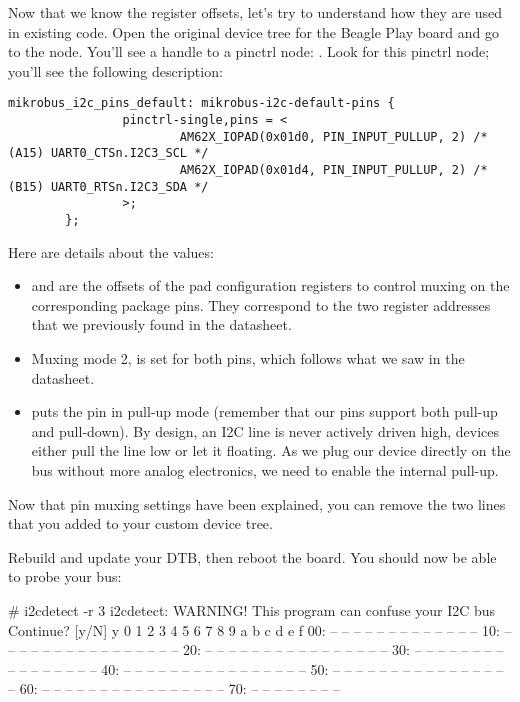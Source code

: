Now that we know the register offsets, let's try to understand
how they are used in existing code. Open the original device tree
for the Beagle Play board and go to the  node.
You'll see a handle to a pinctrl node: .
Look for this pinctrl node; you'll see the following description:

\begin{verbatim}
mikrobus_i2c_pins_default: mikrobus-i2c-default-pins {
                pinctrl-single,pins = < 
                        AM62X_IOPAD(0x01d0, PIN_INPUT_PULLUP, 2) /* (A15) UART0_CTSn.I2C3_SCL */
                        AM62X_IOPAD(0x01d4, PIN_INPUT_PULLUP, 2) /* (B15) UART0_RTSn.I2C3_SDA */
                >;
        };
\end{verbatim}

Here are details about the values:

\begin{itemize}
\item {} and  are the offsets
      of the pad configuration registers to control muxing on the
      corresponding package pins. They correspond to the two register
      addresses that we previously found in the datasheet.
\item Muxing mode 2, is set for both pins, which follows what we saw in
      the datasheet.
\item {} puts the pin in pull-up mode (remember
      that our pins support both pull-up and pull-down). By design, an
      I2C line is never actively driven high, devices either pull the
      line low or let it floating. As we plug our device directly on the
      bus without more analog electronics, we need to enable the
      internal pull-up.
\end{itemize}

Now that pin muxing settings have been explained, you can remove the two
 lines that you added to your custom device tree.

Rebuild and update your DTB, then reboot the board. You should
now be able to probe your bus:

\begin{bashinput}
# i2cdetect -r 3
i2cdetect: WARNING! This program can confuse your I2C bus
Continue? [y/N] y
     0  1  2  3  4  5  6  7  8  9  a  b  c  d  e  f
00:          -- -- -- -- -- -- -- -- -- -- -- -- -- 
10: -- -- -- -- -- -- -- -- -- -- -- -- -- -- -- -- 
20: -- -- -- -- -- -- -- -- -- -- -- -- -- -- -- -- 
30: -- -- -- -- -- -- -- -- -- -- -- -- -- -- -- -- 
40: -- -- -- -- -- -- -- -- -- -- -- -- -- -- -- -- 
50: -- -- -- -- -- -- -- -- -- -- -- -- -- -- -- -- 
60: -- -- -- -- -- -- -- -- -- -- -- -- -- -- -- -- 
70: -- -- -- -- -- -- -- --
\end{bashinput}


